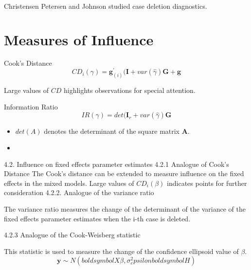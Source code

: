 \documentclass[12pt, a4paper]{article}
\begin{document}
Christensen Petersen and Johnson studied case deletion diagnostics. 




\section{Measures of Influence}

Cook's Distance
\[  CD_{i}(\gamma) = \boldsymbol{g}^{\prime}_{(i)} ( \boldsymbol{I} + var(\hat{\gamma}) \boldsymbol{G} + \boldsymbol{g}\]

Large values of $CD$ highlights observations for special attention.

Information Ratio
\[ IR(\gamma) = det( \boldsymbol{I}_r + var(\hat{\gamma})\boldsymbol{G} \]

\begin{itemize}
\item $det(A)$ denotes the determinant of the square matrix $\boldsymbol{A}$.
\item
\end{itemize}

4.2. Influence on fixed effects parameter estimates
4.2.1 Analogue of Cook’s Distance
The Cook’s distance can be extended to measure influence on the fixed effects in the mixed models.
Large values of $CD_i(\beta)$ indicates points for further consideration
4.2.2. Analogue of the variance ratio

The variance ratio measures the change of the determinant of the variance of the fixed effects parameter estimates when the i-th case is deleted.

4.2.3 Analogue of the Cook-Weisberg statistic

This statistic is used to measure the change of the confidence ellipsoid value of $\beta$.
\[ \boldsymbol{y} \sim N ( boldsymbol{X}\beta , \sigma^2_epsilon boldsymbol{H})\]
\end{document}
